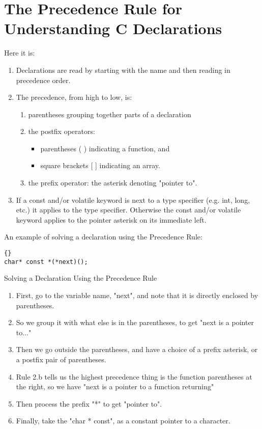\documentclass{report}
\begin{document}
\section{The Precedence Rule for Understanding C Declarations}
Here it is:
\begin{enumerate}
\item Declarations are read by starting with the name and then reading in precedence order.
\item The precedence, from high to low, is:
\begin{enumerate}
\item parentheses grouping together parts of a declaration
\item the postfix operators:
\begin{itemize}
\item parentheses ( ) indicating a function, and
\item square brackets [ ] indicating an array.
\end{itemize}
\item the prefix operator: the asterisk denoting "pointer to".
\end{enumerate}
\item If a const and/or volatile keyword is next to a type specifier (e.g. int, long, etc.) it applies to the type specifier. Otherwise the const and/or volatile keyword applies to the pointer asterisk on its immediate left. 
\end{enumerate}
An example of solving a declaration using the Precedence Rule: 
\begin{lstlisting}{}
char* const *(*next)(); 
\end{lstlisting}
Solving a Declaration Using the Precedence Rule

\begin{enumerate}
\item First, go to the variable name, "next", and note that it is directly enclosed by parentheses.
\item So we group it with what else is in the parentheses, to get "next is a pointer to..."
\item Then we go outside the parentheses, and have a choice of a prefix asterisk, or a postfix pair of parentheses. 
\item Rule 2.b tells us the highest precedence thing is the function parentheses at the right, so we have "next is a pointer to a function returning"
\item Then process the prefix "*" to get "pointer to".
\item Finally, take the "char * const", as a constant pointer to a character. 
\end{enumerate}
\end{document}
